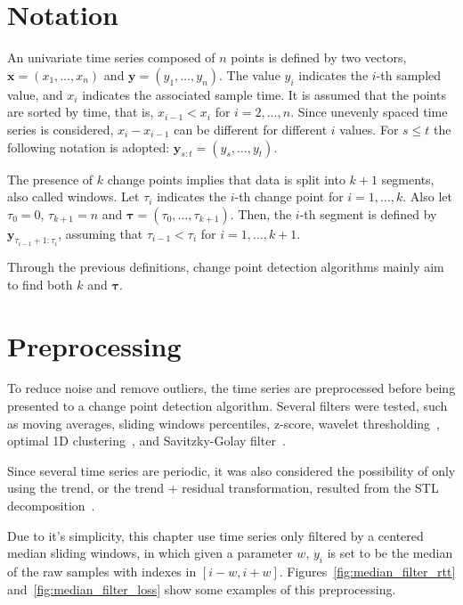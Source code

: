 \section{Notation}

An univariate time series composed of $n$ points is defined by two vectors,
$\mathbf{x} = (x_{1}, \ldots, x_{n})$ and $\mathbf{y} = (y_{1}, \ldots, y_{n})$.
The value $y_{i}$ indicates the $i$-th sampled value, and $x_{i}$ indicates the
associated sample time. It is assumed that the points are sorted by time, that
is, $x_{i - 1} < x_{i}$ for $i = 2, \ldots, n$. Since unevenly spaced time
series is considered, $x_{i} - x_{i - 1}$ can be different for different $i$
values. For $s \le t$ the following notation is adopted:
$\mathbf{y}_{s:t} = (y_{s}, \ldots, y_{t})$.

The presence of $k$ change points implies that data is split into $k+1$
segments, also called windows. Let $\tau_{i}$ indicates the $i$-th change point
for $i=1, \ldots, k$. Also let $\tau_{0} = 0$, $\tau_{k + 1} = n$ and
$\boldsymbol \tau = (\tau_{0}, \ldots, \tau_{k + 1})$. Then, the $i$-th segment
is defined by $\mathbf{y}_{\tau_{i - 1} + 1 : \tau_{i}}$, assuming that
$\tau_{i - 1} < \tau_{i}$ for $i = 1, \ldots, k + 1$.

Through the previous definitions, change point detection algorithms mainly aim
to find both $k$ and $\boldsymbol \tau$.

\section{Preprocessing}

To reduce noise and remove outliers, the time series are
preprocessed before being presented to a change point detection algorithm.
Several filters were tested, such as moving averages, sliding windows
percentiles, z-score,
wavelet thresholding~\cite{an_introduction_to_wavelets}, optimal 1D
clustering~\cite{ckmeans_1d_dp_optimal_k_means_clustering_in_one_dimension_by_dynamic_programming},
and Savitzky-Golay filter~\cite{savgol}.

Since several time series are
periodic, it was also considered the possibility of only using the
trend, or the trend + residual transformation,
resulted from the STL
decomposition~\cite{stl_a_seasonal_trend_decomposition_procedure_based_on_loess}.

Due to it's simplicity,
this chapter use time series only filtered by a centered median
sliding windows, in which given a parameter $w$, $y_{i}$ is set to be
the median of the raw samples with indexes in $[i-w, i+w]$.
Figures~\ref{fig:median_filter_rtt} and~\ref{fig:median_filter_loss} show
some examples of this preprocessing.

